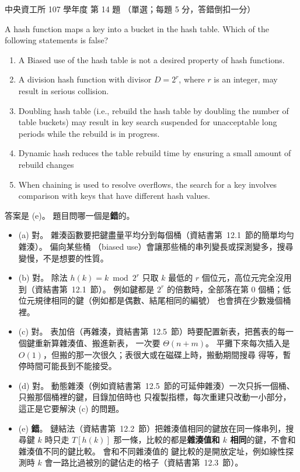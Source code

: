 \begin{pastexam}[label={px:ncu-107-dsa-14}]{中央資工所 107 學年度 第 14 題}
（單選；每題 5 分，答錯倒扣一分）

A hash function maps a key into a bucket in the hash table. Which of the following statements is
false?
\begin{enumerate}[label=(\alph*)]
\item A Biased use of the hash table is not a desired property of hash functions.
\item A division hash function with divisor $D=2^r$, where $r$ is an integer, may result in
serious collision.
\item Doubling hash table (i.e., rebuild the hash table by doubling the number of table buckets)
may result in key search suspended for unacceptable long periods while the rebuild is in progress.
\item Dynamic hash reduces the table rebuild time by ensuring a small amount of rebuild changes
\item When chaining is used to resolve overflows, the search for a key involves comparison with
keys that have different hash values.
\end{enumerate}
\end{pastexam}

\begin{pastsoln}
答案是 (e)。 題目問哪一個是\textbf{錯}的。

\begin{itemize}
\item (a) 對。 雜湊函數要把鍵盡量平均分到每個桶（資結書第~12.1~節的簡單均勻雜湊）。 偏向某些桶
（biased use）會讓那些桶的串列變長或探測變多，搜尋變慢，不是想要的性質。
\item (b) 對。 除法 $h(k) = k \bmod 2^r$ 只取 $k$ 最低的 $r$ 個位元，高位元完全沒用到（資結書第~12.1~節）。
例如鍵都是 $2^r$ 的倍數時，全部落在第 $0$ 個桶；低位元規律相同的鍵（例如都是偶數、結尾相同的編號）
也會擠在少數幾個桶裡。
\item (c) 對。 表加倍（再雜湊，資結書第~12.5~節）時要配置新表，把舊表的每一個鍵重新算雜湊值、搬進新表，
一次要 $\Theta(n + m)$。 平攤下來每次插入是 $O(1)$，但搬的那一次很久；表很大或在磁碟上時，搬動期間搜尋
得等，暫停時間可能長到不能接受。
\item (d) 對。 動態雜湊（例如資結書第~12.5~節的可延伸雜湊）一次只拆一個桶、只搬那個桶裡的鍵，目錄加倍時也
只複製指標，每次重建只改動一小部分，這正是它要解決 (c) 的問題。
\item (e) \textbf{錯}。 鏈結法（資結書第~12.2~節）把雜湊值相同的鍵放在同一條串列，搜尋鍵 $k$ 時只走
$T[h(k)]$ 那一條，比較的都是\textbf{雜湊值和 $k$ 相同}的鍵，不會和雜湊值不同的鍵比較。 會和不同雜湊值的
鍵比較的是開放定址，例如線性探測時 $k$ 會一路比過被別的鍵佔走的格子（資結書第~12.3~節）。
\end{itemize}
\end{pastsoln}
